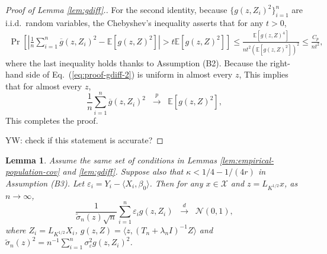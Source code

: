 \documentclass[11pt,a4paper]{article}
\renewcommand{\tilde}{\widetilde}
\renewcommand{\bar}{\overline}
\theoremstyle{definition}
\theoremstyle{plain}
\newtheorem{lemma}{Lemma}[section]
\theoremstyle{remark}
\newcommand{\mX}{\mathcal X}
\begin{document}
\begin{proof}[Proof of Lemma \ref{lem:gdiff}.]
For the second identity, because $\{g(z,Z_i)^2\}_{i=1}^n$ are i.i.d.~random variables,
the Chebyshev's inequality asserts that for any $t>0$, 
\begin{align}
\Pr\left[\left|\frac{1}{n}\sum_{i=1}^n \bar g(z,Z_i)^2 - \mathbb E[g(z,Z)^2]\right| > t\mathbb E[g(z,Z)^2]\right] \leq \frac{\mathbb E[g(z,Z)^4]}{nt^2(\mathbb E[g(z,Z)^2])^2} \leq \frac{C_p}{nt^2},
\label{eq:proof-gdiff-2}
\end{align}
where the last inequality holds thanks to Assumption (B2). 
{\color{magenta}
Because the right-hand side of Eq.~(\ref{eq:proof-gdiff-2}) is uniform in almost every $z$,
This implies that for almost every $z$,
\begin{equation*}
\frac{1}{n}\sum_{i=1}^n\bar g(z,Z_i)^2 \;\;\overset{p}{\to}\;\; \mathbb E[g(z,Z)^2],
\end{equation*} 
This completes the proof. 
}

{\color{magenta} YW: check if this statement is accurate?}
\end{proof}

\begin{lemma}
Assume the same set of conditions in Lemmas \ref{lem:empirical-population-cov} and \ref{lem:gdiff}. 
{\color{cyan}Suppose also that $\kappa < 1/4-1/(4r)$ in Assumption (B3).}
Let $\varepsilon_i = Y_i - \langle X_i,\beta_0\rangle$. 
Then for any $x\in\mX$ and $z=L_{K^{1/2}}x$, as $n\to\infty$, 
$$
\frac{1}{\tilde\sigma_n(z)\sqrt{n}}\sum_{i=1}^n \varepsilon_i g(z,Z_i)\;\;\overset{d}{\to}\;\; \mathcal N(0,1),
$$
where $Z_i=L_{K^{1/2}}X_i$, $g(z,Z)=\langle z,(T_n+\lambda_n I)^{-1}Z\rangle$ and $\tilde\sigma_n(z)^2 = n^{-1}\sum_{i=1}^n \sigma_\varepsilon^2g(z,Z_i)^2$.
\label{lem:isoclt}
\end{lemma}
\end{document}
